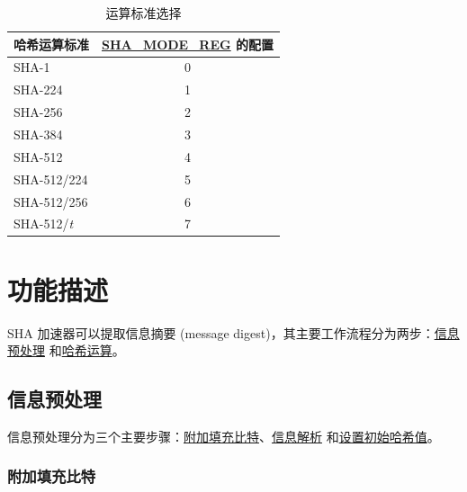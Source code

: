 \documentclass[main\_\_CN.tex]{subfiles}
\begin{document}
\begin{longtable}[c]{|l|c|}
\caption{运算标准选择}
\label{tab:sha-mode-summary}
\\\hline
\rowcolor{lightgray}
\textbf{哈希运算标准} & \textbf{\hyperref[regdesc:SHAMODEREG]{SHA\_MODE\_REG} 的配置}\\
    \hline
    SHA-1               & 0\\\hline
    SHA-224             & 1\\\hline
    SHA-256             & 2\\\hline
    SHA-384             & 3 \\\hline
    SHA-512             & 4 \\\hline
    SHA-512/224         & 5 \\\hline
    SHA-512/256         & 6 \\\hline
    SHA-512/{\it{t}}    & 7 \\\hline
    \hline
\end{longtable}



\section{功能描述}

SHA 加速器可以提取信息摘要 (message digest)，其主要工作流程分为两步：\hyperref[sec:sha-preprocessing]{信息预处理} 和\hyperref[sec:sha-hash-operation]{哈希运算}。



\subsection{信息预处理}\label{sec:sha-preprocessing}

信息预处理分为三个主要步骤：\hyperref[sec:sha-textpadding]{附加填充比特}、\hyperref[sec:sha-parsingmessage]{信息解析} 和\hyperref[sec:sha-initialhash]{设置初始哈希值}。

\subsubsection{附加填充比特}\label{sec:sha-textpadding}
\end{document}
